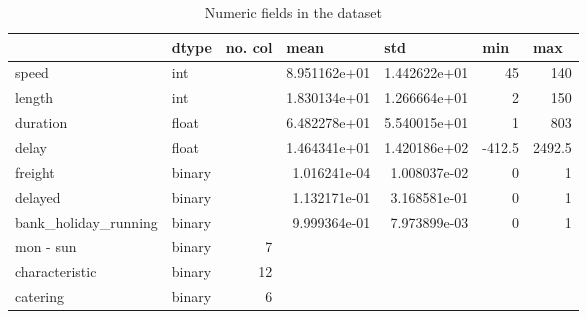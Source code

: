\documentclass[12pt,a4paper]{article}
\begin{document}
\begin{table}[]
\centering
\caption{Numeric fields in the dataset}
\label{table:etl_numeric}
\begin{tabular}{|l|l|r|r|r|r|r|}
\hline
                       & dtype  & \multicolumn{1}{l|}{no. col} & \multicolumn{1}{l|}{mean} & \multicolumn{1}{l|}{std} & \multicolumn{1}{l|}{min} & \multicolumn{1}{l|}{max} \\ \hline
speed                  & int    &                                  & 8.951162e+01              & 1.442622e+01             & 45                       & 140                      \\ \hline
length                 & int    &                                  & 1.830134e+01              & 1.266664e+01             & 2                        & 150                      \\ \hline
duration               & float  &                                  & 6.482278e+01              & 5.540015e+01             & 1                        & 803                      \\ \hline
delay                  & float  &                                  & 1.464341e+01              & 1.420186e+02             & -412.5                   & 2492.5                   \\ \hline
freight                & binary &                                  & 1.016241e-04              & 1.008037e-02             & 0                        & 1                        \\ \hline
delayed                & binary &                                  & 1.132171e-01              & 3.168581e-01             & 0                        & 1                        \\ \hline
bank\_holiday\_running & binary &                                  & 9.999364e-01              & 7.973899e-03             & 0                        & 1                        \\ \hline
mon - sun              & binary & 7                                &                           &                          &                          &                          \\ \hline
characteristic         & binary & 12                               &                           &                          &                          &                          \\ \hline
catering               & binary & 6                                &                           &                          &                          &                          \\ \hline
\end{tabular}
\end{table}
\end{document}
